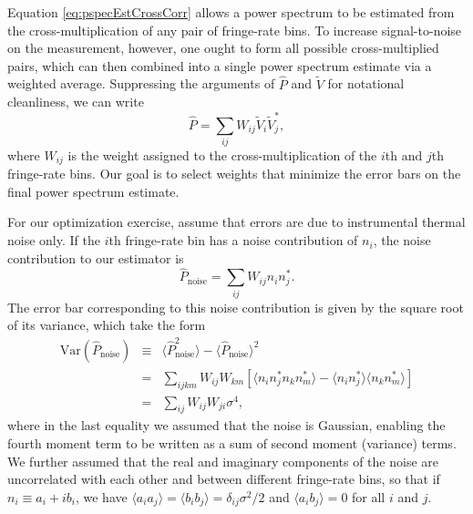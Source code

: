 \documentclass[twocolumn,apj,numberedappendix]{emulateapj}
\begin{document}
Equation \eqref{eq:pspecEstCrossCorr} allows a power spectrum to be estimated from the cross-multiplication of any pair of fringe-rate bins. To increase signal-to-noise on the measurement, however, one ought to form all possible cross-multiplied pairs, which can then combined into a single power spectrum estimate via a weighted average. Suppressing the arguments of $\widehat{P}$ and $\widetilde{V}$ for notational cleanliness, we can write
\begin{equation}
\widehat{P} = \sum_{ij} W_{ij} \widetilde{V}_i \widetilde{V}_j^*,
\end{equation}
where $W_{ij}$ is the weight assigned to the cross-multiplication of the $i$th and $j$th fringe-rate bins. Our goal is to select weights that minimize the error bars on the final power spectrum estimate.

For our optimization exercise, assume that errors are due to instrumental thermal noise only. If the $i$th fringe-rate bin has a noise contribution of $n_i$, the noise contribution to our estimator is
\begin{equation}
\widehat{P}_\textrm{noise} = \sum_{ij} W_{ij} n_i n_j^*.
\end{equation}
The error bar corresponding to this noise contribution is given by the square root of its variance, which take the form
\begin{eqnarray}
\textrm{Var}(\widehat{P}_\textrm{noise} ) &\equiv& \langle \widehat{P}_\textrm{noise}^2 \rangle - \langle \widehat{P}_\textrm{noise} \rangle^2 \nonumber \\
&= & \sum_{ijkm} W_{ij} W_{km} \left[ \langle n_i n_j^* n_k n_m^* \rangle - \langle n_i n_j^*\rangle \langle n_k n_m^* \rangle \right] \nonumber \\
&=&  \sum_{ij} W_{ij} W_{ji}\sigma^4,
\end{eqnarray}
where in the last equality we assumed that the noise is Gaussian, enabling the fourth moment term to be written as a sum of second moment (variance) terms. We further assumed that the real and imaginary components of the noise are uncorrelated with each other and between different fringe-rate bins, so that if $n_i \equiv a_i + i b_i$, we have $\langle a_i a_j \rangle = \langle b_i b_j \rangle = \delta_{ij} \sigma^2/2 $ and $\langle a_i b_j \rangle= 0$ for all $i$ and $j$.
\end{document}
